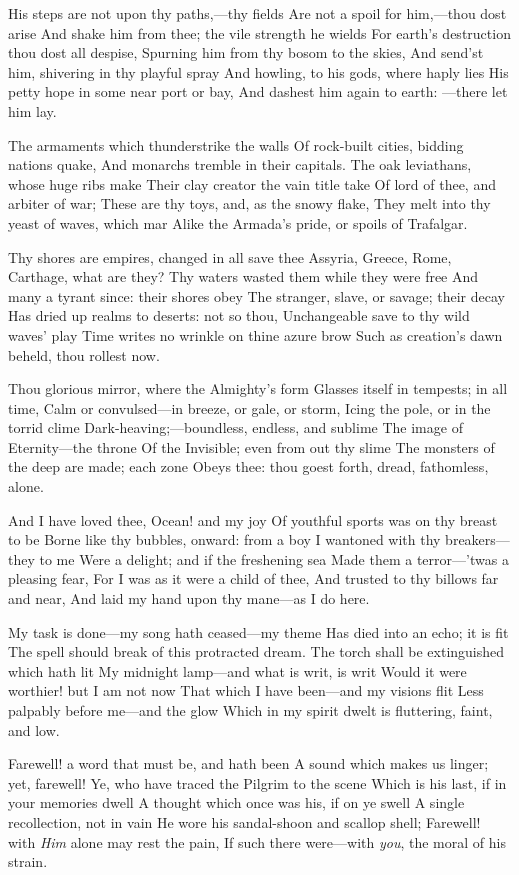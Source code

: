 \documentclass[10pt,twocolumn]{book}
\begin{document}
   His steps are not upon thy paths,---thy fields
   Are not a spoil for him,---thou dost arise
   And shake him from thee; the vile strength he wields
   For earth's destruction thou dost all despise,
   Spurning him from thy bosom to the skies,
   And send'st him, shivering in thy playful spray
   And howling, to his gods, where haply lies
   His petty hope in some near port or bay,
And dashest him again to earth: ---there let him lay.


   The armaments which thunderstrike the walls
   Of rock-built cities, bidding nations quake,
   And monarchs tremble in their capitals.
   The oak leviathans, whose huge ribs make
   Their clay creator the vain title take
   Of lord of thee, and arbiter of war;
   These are thy toys, and, as the snowy flake,
   They melt into thy yeast of waves, which mar
Alike the Armada's pride, or spoils of Trafalgar.


   Thy shores are empires, changed in all save thee\textemdash
   Assyria, Greece, Rome, Carthage, what are they?
   Thy waters wasted them while they were free
   And many a tyrant since:  their shores obey
   The stranger, slave, or savage; their decay
   Has dried up realms to deserts:  not so thou,
   Unchangeable save to thy wild waves' play\textemdash
   Time writes no wrinkle on thine azure brow\textemdash
Such as creation's dawn beheld, thou rollest now.


   Thou glorious mirror, where the Almighty's form
   Glasses itself in tempests; in all time,
   Calm or convulsed---in breeze, or gale, or storm,
   Icing the pole, or in the torrid clime
   Dark-heaving;---boundless, endless, and sublime\textemdash
   The image of Eternity---the throne
   Of the Invisible; even from out thy slime
   The monsters of the deep are made; each zone
Obeys thee:  thou goest forth, dread, fathomless, alone.


   And I have loved thee, Ocean! and my joy
   Of youthful sports was on thy breast to be
   Borne like thy bubbles, onward:  from a boy
   I wantoned with thy breakers---they to me
   Were a delight; and if the freshening sea
   Made them a terror---'twas a pleasing fear,
   For I was as it were a child of thee,
   And trusted to thy billows far and near,
And laid my hand upon thy mane---as I do here.


   My task is done---my song hath ceased---my theme
   Has died into an echo; it is fit
   The spell should break of this protracted dream.
   The torch shall be extinguished which hath lit
   My midnight lamp---and what is writ, is writ\textemdash
   Would it were worthier! but I am not now
   That which I have been---and my visions flit
   Less palpably before me---and the glow
Which in my spirit dwelt is fluttering, faint, and low.


   Farewell! a word that must be, and hath been\textemdash
   A sound which makes us linger; yet, farewell!
   Ye, who have traced the Pilgrim to the scene
   Which is his last, if in your memories dwell
   A thought which once was his, if on ye swell
   A single recollection, not in vain
   He wore his sandal-shoon and scallop shell;
   Farewell! with \textit{Him} alone may rest the pain,
If such there were---with \textit{you}, the moral of his strain.


\endVersus
\end{document}

